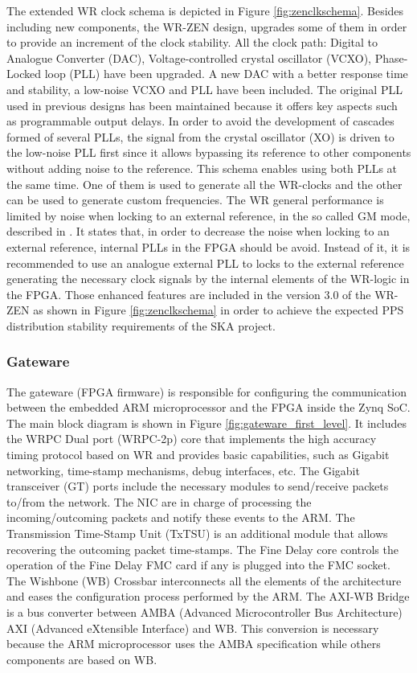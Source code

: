 The extended WR clock schema is depicted in Figure \ref{fig:zenclkschema}.
Besides including new components, the WR-ZEN design, upgrades some of them
in order to provide an increment of the clock stability. All the clock path: Digital to Analogue Converter (DAC), Voltage-controlled crystal oscillator (VCXO), Phase-Locked loop (PLL) have been upgraded. A new DAC with a better
response time and stability, a low-noise VCXO and PLL have been included. 
The original PLL used in previous designs has been maintained because it offers key aspects such as programmable output delays. In order to avoid the development of cascades formed of several PLLs, the signal from the crystal oscillator (XO) is driven to the low-noise PLL first since it allows bypassing its reference to other components without adding noise to the reference. This schema enables using both PLLs at the same time. One of them is used to generate all the WR-clocks and the other can be used to generate custom frequencies. The WR general performance is limited by noise when locking to an external reference, in the so called GM mode, described in \cite{Rizzi2016}. It states that, in order to decrease the noise when locking to an external reference, internal PLLs in the FPGA should be avoid. Instead of it, it is recommended to use an analogue external PLL to locks to the external reference generating the necessary clock signals by the internal elements of the WR-logic in the FPGA. Those enhanced features are included in the version 3.0 of the WR-ZEN as shown in Figure \ref{fig:zenclkschema} in order to achieve the expected PPS distribution stability requirements of the SKA project.


\subsubsection{Gateware} \label{subsec:gateware}

The gateware (FPGA firmware) is responsible for configuring the communication between the embedded ARM microprocessor and the FPGA inside the Zynq SoC. 
The main block diagram is shown in Figure \ref{fig:gateware_first_level}. 
It includes the WRPC Dual port (WRPC-2p) core that implements the high accuracy timing protocol based on WR and provides basic capabilities, such as Gigabit networking, time-stamp mechanisms, debug interfaces, etc. The Gigabit transceiver (GT) ports include the necessary modules to send/receive packets to/from the network. The NIC are in charge of processing the incoming/outcoming
packets and notify these events to the ARM. The Transmission Time-Stamp Unit
(TxTSU) is an additional module that allows recovering the outcoming packet
time-stamps. The Fine Delay core controls the operation of the Fine Delay FMC
card if any is plugged into the FMC socket. The Wishbone (WB) Crossbar
interconnects all the elements of the architecture and eases the configuration
process performed by the ARM. The AXI-WB Bridge is a bus converter between AMBA (Advanced Microcontroller Bus Architecture)
AXI (Advanced eXtensible Interface) and WB. This conversion is necessary because the ARM microprocessor
uses the AMBA specification while others components are based on WB.

